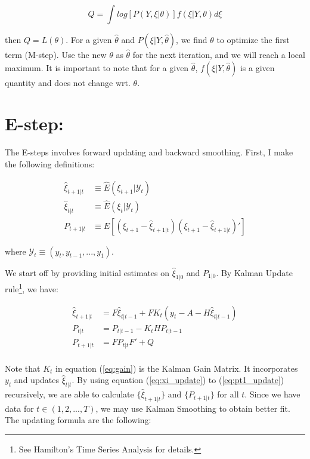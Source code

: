 \documentclass[12pt]{article}
\numberwithin{equation}{section}
\begin{document}
\[
    Q = \int log[P(Y,\xi|\theta)]f(\xi|Y,\theta)d\xi
\]

then $Q = L(\theta)$. For a given $\hat{\theta}$ and $P(\xi|Y, \hat{\theta})$, we find $\theta$ to optimize the first term (M-step). Use the new $\theta$ as $\hat{\theta}$ for the next iteration, and we will reach a local maximum. It is important to note that for a given $\hat{\theta}$, $f(\xi|Y, \hat{\theta})$ is a given quantity and does not change wrt. $\theta$. 

\section{E-step:} \label{sec:E}

The E-steps involves forward updating and backward smoothing. First, I make the following definitions:

\begin{align*}
    \hat{\xi}_{t+1|t} & \equiv \hat{E}(\xi_{t+1}|\mathcal{Y}_t) \\
    \hat{\xi}_{t|t} & \equiv \hat{E}(\xi_{t}|\mathcal{Y}_t) \\
    P_{t+1|t} & \equiv E[(\xi_{t+1} - \hat{\xi}_{t+1|t})(\xi_{t+1} - \hat{\xi}_{t+1|t})']
\end{align*}

where $\mathcal{Y}_t\equiv(y_t,y_{t-1},...,y_1)$. 

We start off by providing initial estimates on $\hat{\xi}_{1|0}$ and $P_{1|0}$. By Kalman Update rule\footnote{See Hamilton's Time Series Analysis for details.}, we have:

\begin{align}
    \hat{\xi}_{t+1|t} & = F\hat{\xi}_{t|t-1} + FK_t(y_t - A - H\hat{\xi}_{t|t-1}) \label{eq:xi_update} \\
    P_{t|t} & = P_{t|t-1} - K_tHP_{t|t-1} \label{eq:p_update} \\
    P_{t+1|t} & = FP_{t|t}F'+Q \label{eq:pt1_update} \\
\end{align}

Note that $K_t$ in equation (\ref{eq:gain}) is the Kalman Gain Matrix. It incorporates $y_t$ and updates $\hat{\xi}_{t|t}$. By using equation (\ref{eq:xi_update}) to (\ref{eq:pt1_update}) recursively, we are able to calculate $\{\hat{\xi}_{t+1|t}\}$ and $\{P_{t+1|t}\}$ for all $t$. 
Since we have data for $t \in (1,2,...,T)$, we may use Kalman Smoothing to obtain better fit. The updating formula are the following:
\end{document}
